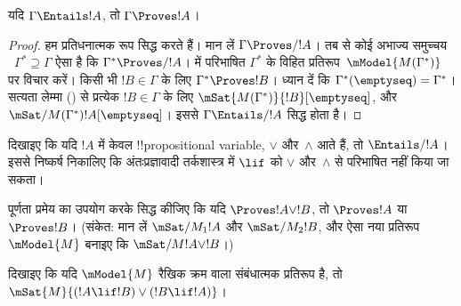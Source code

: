 \documentclass[../../../include/open-logic-section]{subfiles}
\begin{document}


\begin{thm}
  यदि $\Gamma \Entails !A$, तो $\Gamma \Proves !A$।
\end{thm}

\begin{proof}
  हम प्रतिधनात्मक रूप सिद्ध करते हैं। मान लें $\Gamma \Proves/ !A$। तब
   से कोई अभाज्य समुच्चय
  ~$\Gamma^* \supseteq \Gamma$ ऐसा है कि $\Gamma^* \Proves/ !A$।
   में परिभाषित $\Gamma^*$ के विहित
  प्रतिरूप~$\mModel{M(\Gamma^*)}$ पर विचार करें। किसी भी
  $!B \in \Gamma$ के लिए $\Gamma^* \Proves !B$। ध्यान दें कि
  $\Gamma^*(\emptyseq) = \Gamma^*$। सत्यता लेम्मा
  () से प्रत्येक $!B \in \Gamma$ के लिए
  $\mSat{M(\Gamma^*)}{!B}[\emptyseq]$, और
  $\mSat/{M(\Gamma^*)}{!A}[\emptyseq]$। इससे
  $\Gamma \Entails/ !A$ सिद्ध होता है।
\end{proof}

\begin{prob}
  दिखाइए कि यदि $!A$ में केवल !!{propositional variable}, $\lor$ और~$\land$ आते
  हैं, तो $\Entails/ !A$। इससे निष्कर्ष निकालिए कि अंतःप्रज्ञावादी
  तर्कशास्त्र में $\lif$ को $\lor$ और~$\land$ से परिभाषित नहीं किया जा सकता।
\end{prob}
  
\begin{prob}
  पूर्णता प्रमेय का उपयोग करके सिद्ध कीजिए कि यदि
  $\Proves !A \lor !B$, तो $\Proves !A$ या $\Proves !B$। (संकेत: मान लें
  $\mSat/{M_1}{!A}$ और $\mSat/{M_2}{!B}$, और ऐसा नया प्रतिरूप~$\mModel{M}$
  बनाइए कि $\mSat/{M}{!A \lor !B}$।)
\end{prob}
  
\begin{prob} 
  दिखाइए कि यदि $\mModel{M}$ रैखिक क्रम वाला संबंधात्मक प्रतिरूप है, तो
  $\mSat{M}{(!A \lif !B)\lor(!B \lif !A)}$।
\end{prob}
\end{document}
